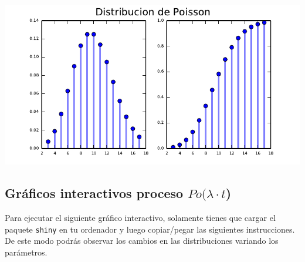 \documentclass[]{book}
\begin{document}
\includegraphics{curso-probabilidad-udemy_files/figure-latex/py_poiss2-1.pdf}

\hypertarget{gruxe1ficos-interactivos-proceso-polambdacdot-t}{%
\subsection{\texorpdfstring{Gráficos interactivos proceso \(Po(\lambda\cdot t\))}{Gráficos interactivos proceso Po(\textbackslash{}lambda\textbackslash{}cdot t)}}\label{gruxe1ficos-interactivos-proceso-polambdacdot-t}}

Para ejecutar el siguiente gráfico interactivo, solamente tienes que cargar el paquete \texttt{shiny} en tu ordenador y luego copiar/pegar las siguientes instrucciones. De este modo podrás observar los cambios en las distribuciones variando los parámetros.
\end{document}
